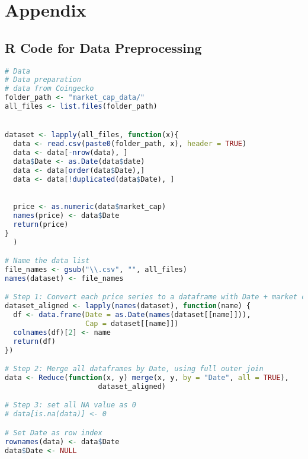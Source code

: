 \documentclass[12pt]{article}
\begin{document}
\newpage
\appendix
\section*{Appendix}
\subsection*{R Code for Data Preprocessing}
\begin{lstlisting}[language=R, caption={Data Preprocessing}]
# Data
# Data preparation
# data from Coingecko
folder_path <- "market_cap_data/"
all_files <- list.files(folder_path)


dataset <- lapply(all_files, function(x){
  data <- read.csv(paste0(folder_path, x), header = TRUE)
  data <- data[-nrow(data), ]
  data$Date <- as.Date(data$date)
  data <- data[order(data$Date),]
  data <- data[!duplicated(data$Date), ]

  
  price <- as.numeric(data$market_cap)
  names(price) <- data$Date
  return(price)
}
  )

# Name the data list
file_names <- gsub("\\.csv", "", all_files)
names(dataset) <- file_names

# Step 1: Convert each price series to a dataframe with Date + market cap
dataset_aligned <- lapply(names(dataset), function(name) {
  df <- data.frame(Date = as.Date(names(dataset[[name]])),
                   Cap = dataset[[name]])
  colnames(df)[2] <- name
  return(df)
})

# Step 2: Merge all dataframes by Date, using full outer join
data <- Reduce(function(x, y) merge(x, y, by = "Date", all = TRUE),
                      dataset_aligned)

# Step 3: set all NA value as 0
# data[is.na(data)] <- 0

# Set Date as row index
rownames(data) <- data$Date
data$Date <- NULL
\end{lstlisting}
\end{document}
